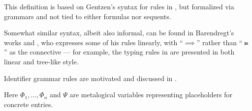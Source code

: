 \begin{comments}
  \item This definition is based on Gentzen's syntax for rules in \cite[181]{Gentzen1935LogischeSchließen}, but formalized via grammars and not tied to either formulas nor sequents.

  \item Somewhat similar syntax, albeit also informal, can be found in Barendregt's works \cite{Barendregt1984LambdaCalculus} and \cite{Barendregt1992LambdaCalculiWithTypes}, who expresses some of his rules linearly, with \enquote{\( {\implies} \)} rather than \enquote{\( \vDdash \)} as the connective --- for example, the typing rules in \cite[def. 3.1.3]{Barendregt1992LambdaCalculiWithTypes} are presented in both linear and tree-like style.

  \item Identifier grammar rules are motivated and discussed in .

  \item Here \( \Phi_1, \ldots, \Phi_n \) and \( \Psi \) are metalogical variables representing placeholders for concrete entries.
\end{comments}

